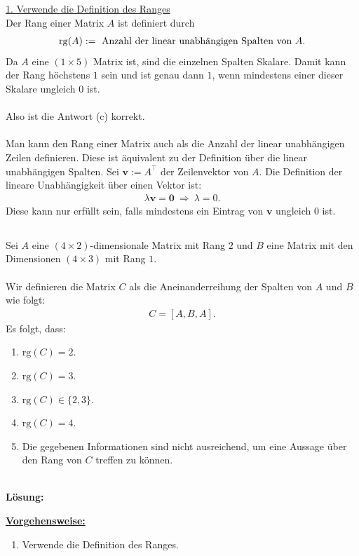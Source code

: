 \underline{1. Verwende die Definition des Ranges}\\
Der Rang einer Matrix $ A $ ist definiert durch
\begin{align*}
	\mathrm{rg}(A) := \ \text{Anzahl der linear unabhängigen Spalten von $ A $}.
\end{align*}
Da $ A $ eine $ (1 \times 5) $ Matrix ist, sind die einzelnen Spalten Skalare.
Damit kann der Rang höchstens $ 1 $ sein und ist genau dann $ 1 $, wenn mindestens einer dieser Skalare ungleich $ 0 $ ist.\\
\\
Also ist die Antwort (c) korrekt.\\
\\
Man kann den Rang einer Matrix auch als die Anzahl der linear unabhängigen Zeilen definieren. Diese ist äquivalent zu der Definition über die linear unabhängigen Spalten. Sei $ \textbf{v} := A^\top $ der Zeilenvektor von $ A $. Die Definition der lineare Unabhängigkeit über einen Vektor ist: 
\begin{align*}
	\lambda \textbf{v} = \textbf{0} \ \Rightarrow \ \lambda = 0.
\end{align*}
Diese kann nur erfüllt sein, falls mindestens ein Eintrag von $ \textbf{v} $ ungleich $ 0 $ ist. 


\newpage
\subsection*{}
Sei $ A $ eine $ (4 \times 2) $-dimensionale Matrix mit Rang $ 2 $ und $ B $ eine Matrix mit den Dimensionen $ (4 \times 3) $ mit Rang $ 1 $.\\
\\
Wir definieren die Matrix $ C $ als die Aneinanderreihung der Spalten von $ A $ und $ B $ wie folgt:
\begin{align*}
	C = [A, B, A].
\end{align*}
Es folgt, dass:
\renewcommand{\labelenumi}{(\alph{enumi})}
\begin{enumerate}
	\item 
	$ \mathrm{rg}(C) = 2 $.
	\item
	$ \mathrm{rg}(C) = 3 $.
	\item
	$ \mathrm{rg}(C)\in \{2,3\} $.
	\item
	$ \mathrm{rg}(C) = 4 $.
	\item
	Die gegebenen Informationen sind nicht ausreichend, um eine Aussage über den Rang von $ C $ treffen zu können.
\end{enumerate}
\ \\
\textbf{Lösung:}
\begin{mdframed}
	\underline{\textbf{Vorgehensweise:}}
	\renewcommand{\labelenumi}{\theenumi.}
	\begin{enumerate}
		\item Verwende die Definition des Ranges.
	\end{enumerate}
\end{mdframed}

